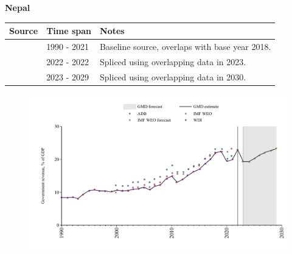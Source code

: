 \documentclass[12pt,a4paper,landscape]{article}
\begin{document}
\begin{adjustbox}{max totalsize={\paperwidth}{\paperheight},center}
\begin{minipage}[t][\textheight][t]{\textwidth}
\vspace*{0.5cm}
{}
\begin{center}
{\Large\bfseries Nepal}
\end{center}
\vspace{0.5cm}
\begin{table}[H]
\centering
\small
\begin{tabular}{|l|l|l|}
\hline
\textbf{Source} & \textbf{Time span} & \textbf{Notes} \\
\hline
\rowcolor{white}\cite{WDI}& 1990 - 2021 &Baseline source, overlaps with base year 2018.\\
\rowcolor{lightgray}\cite{IMF_WEO}& 2022 - 2022 &Spliced using overlapping data in 2023.\\
\rowcolor{white}\cite{IMF_WEO_forecast}& 2023 - 2029 &Spliced using overlapping data in 2030.\\
\hline
\end{tabular}
\end{table}
\begin{figure}[H]
\centering
\includegraphics[width=\textwidth,height=0.6\textheight,keepaspectratio]{graphs/NPL_govrev_GDP.pdf}
\end{figure}
\end{minipage}
\end{adjustbox}
\end{document}
